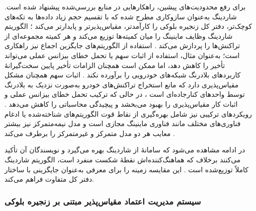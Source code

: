 برای رفع محدودیت‌های پیشین، راهکارهایی در منابع بررسی‌شده پیشنهاد شده است. شاردینگ به‌عنوان سازوکاری مطرح شده که با تقسیم حجم زیاد داده‌ها به تکه‌های کوچک‌تر، دفتر کل زنجیره بلوکی را کارآمدتر، مقیاس‌پذیرتر و پایدارتر می‌کند \cite{ghovanlooyghajarSBTMSScalableBlockchain2021}؛ الگوریتم شاردینگ وظایف ماینینگ را میان کمیته‌ها توزیع می‌کند و هر کمیته مجموعه‌ای از تراکنش‌ها را پردازش می‌کند \cite{ghovanlooyghajarSBTMSScalableBlockchain2021}. استفاده از الگوریتم‌های جایگزین اجماع نیز راهکاری است؛ به‌عنوان مثال، استفاده از اثبات سهم یا تحمل خطای بیزانس عملی می‌تواند تأخیر را کاهش دهد، اما ممکن است همچنان الزامات تأخیر پایین سخت‌گیرانهٔ کاربردهای بلادرنگ شبکه‌های خودرویی را برآورده نکند \cite{razaBlockchainBasedReputationTrust2024}. اثبات سهم همچنان مشکل مقیاس‌پذیری دارد که مانع استخراج تراکنش‌های خودرو به‌صورت نزدیک به بلادرنگ توسط واحدهای کنارجاده‌ای است \cite{ghovanlooyghajarSBTMSScalableBlockchain2021}، در حالی که ترکیب تحمل خطای بیزانس عملی و اثبات کار مقیاس‌پذیری را بهبود می‌بخشد و پیچیدگی محاسباتی را کاهش می‌دهد \cite{razaBlockchainBasedReputationTrust2024}. رویکردهای ترکیبی نیز شامل بهره‌گیری از نقاط قوت الگوریتم‌های شناخته‌شده یا ادغام فناوری‌های مختلف مانند فناوری ماینینگ مجازی است \cite{razaBlockchainBasedReputationTrust2024} و مدل نیمه‌متمرکز نیز بیشتر معایب هر دو مدل متمرکز و غیرمتمرکز را برطرف می‌کند \cite{razaBlockchainBasedReputationTrust2024}.

در ادامه مشاهده می‌شود که سامانهٔ  از شاردینگ بهره می‌گیرد و نویسندگان آن تأکید می‌کنند برخلاف  که هماهنگ‌کننده‌اش نقطهٔ شکست منفرد است، الگوریتم شاردینگ کاملاً توزیع‌شده است \cite{ghovanlooyghajarSBTMSScalableBlockchain2021}. این مقایسه زمینه را برای معرفی  به‌عنوان جایگزینی با ساختار دفتر کل متفاوت فراهم می‌کند.

\subsubsection{سیستم مدیریت اعتماد مقیاس‌پذیر مبتنی بر زنجیره بلوکی }


